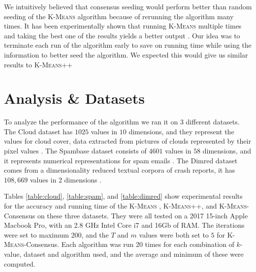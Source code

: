 \documentclass[12pt]{dalthesis}
\newcommand*{\kmeansn}{\textsc{K-Means}} %
\newcommand*{\kmeans}{\textsc{K-Means} } %
\begin{document}
\pagebreak
We intuitively believed that consensus seeding would perform better than random seeding of the \kmeans algorithm because of rerunning the algorithm many times. It has been experimentally shown that running \kmeans multiple times and taking the best one of the results yields a better output \citep{arthur2007k}. Our idea was to terminate each run of the algorithm early to save on running time while using the information to better seed the algorithm. We expected this would give us similar results to \kmeansn++

\section{Analysis \& Datasets}


To analyze the performance of the algorithm we ran it on 3 different datasets. The Cloud dataset has $1025$ values in $10$ dimensions, and they represent the values for cloud cover, data extracted from pictures of clouds represented by their pixel values \citep{cloud}. The Spambase dataset consists of $4601$ values in $58$ dimensions, and it represents numerical representations for spam emails \citep{spam}. The Dimred dataset comes from a dimensionality reduced textual corpora of crash reports, it has $108,669$ values in $2$ dimensions \cite{soto2016machine}.

Tables \ref{table:cloud}, \ref{table:spam}, and \ref{table:dimred} show experimental results for the accuracy and running time of the \kmeans, \kmeansn++, and \kmeansn-Consensus on these three datasets. They were all tested on a 2017 15-inch Apple Macbook Pro, with an 2.8 GHz Intel Core i7 and 16Gb of RAM. The iterations were set to maximum 200, and the $T$ and $m$ values were both set to $5$ for \kmeansn-Consensus. Each algorithm was run 20 times for each combination of $k$-value, dataset and algorithm used, and the average and minimum of these were computed.

\pagebreak
\end{document}
